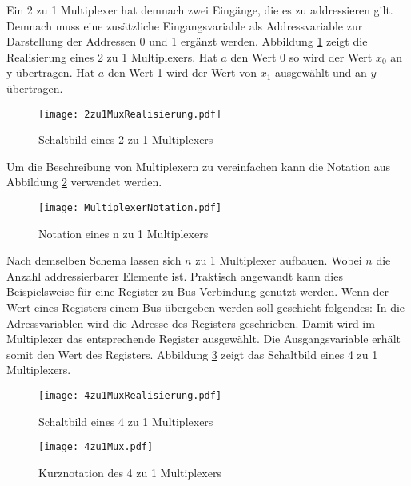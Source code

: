 Ein 2 zu 1 Multiplexer hat demnach zwei Eingänge, die es zu addressieren gilt. Demnach muss eine zusätzliche Eingangsvariable als Addressvariable zur Darstellung der Addressen 0 und 1 ergänzt werden. Abbildung \ref{2zu1MuxReal} zeigt die Realisierung eines 2 zu 1 Multiplexers. Hat $a$ den Wert 0 so wird der Wert $x_0$ an y übertragen. Hat $a$ den Wert 1 wird der Wert von $x_1$ ausgewählt und an $y$ übertragen.
\begin{figure}[htp]
	\centering
	\texttt{[image: 2zu1MuxRealisierung.pdf]}
	\caption{Schaltbild eines 2 zu 1 Multiplexers}
	\label{2zu1MuxReal}
\end{figure}

Um die Beschreibung von Multiplexern zu vereinfachen kann die Notation aus Abbildung \ref{MulNot} verwendet werden.
\begin{figure}[htp]
	\centering
	\texttt{[image: MultiplexerNotation.pdf]}
	\caption{Notation eines n zu 1 Multiplexers}
	\label{MulNot}
\end{figure}

Nach demselben Schema lassen sich $n$ zu 1 Multiplexer aufbauen. Wobei $n$ die Anzahl addressierbarer Elemente ist. Praktisch angewandt kann dies Beispielsweise für eine Register zu Bus Verbindung genutzt werden. Wenn der Wert eines Registers einem Bus übergeben werden soll geschieht folgendes: In die Adressvariablen wird die Adresse des Registers geschrieben. Damit wird im Multiplexer das entsprechende Register ausgewählt. Die Ausgangsvariable erhält somit den Wert des Registers. Abbildung \ref{4zu1MuxReal} zeigt das Schaltbild eines 4 zu 1 Multiplexers.

\begin{figure}[htp]
	\centering
	\texttt{[image: 4zu1MuxRealisierung.pdf]}
	\caption{Schaltbild eines 4 zu 1 Multiplexers}
	\label{4zu1MuxReal}
\end{figure}

\begin{figure}
	\centering
	\texttt{[image: 4zu1Mux.pdf]}
	\caption{Kurznotation des 4 zu 1 Multiplexers}
\end{figure}

